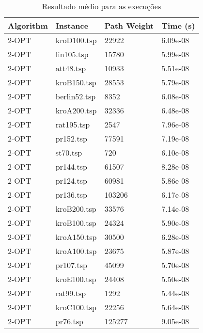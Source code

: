 \documentclass{article}
\begin{document}
\begin{center}

	\begin{table}[ht]
		\centering
		\begin{tabular}{llll}
			\toprule
			\textbf{Algorithm} & \textbf{Instance} & \textbf{Path Weight} & \textbf{Time (s)} \\
			\midrule
			2-OPT              & kroD100.tsp       & 22922                & 6.09e-08          \\
			2-OPT              & lin105.tsp        & 15780                & 5.99e-08          \\
			2-OPT              & att48.tsp         & 10933                & 5.51e-08          \\
			2-OPT              & kroB150.tsp       & 28553                & 5.79e-08          \\
			2-OPT              & berlin52.tsp      & 8352                 & 6.08e-08          \\
			2-OPT              & kroA200.tsp       & 32336                & 6.48e-08          \\
			2-OPT              & rat195.tsp        & 2547                 & 7.96e-08          \\
			2-OPT              & pr152.tsp         & 77591                & 7.19e-08          \\
			2-OPT              & st70.tsp          & 720                  & 6.10e-08          \\
			2-OPT              & pr144.tsp         & 61507                & 8.28e-08          \\
			2-OPT              & pr124.tsp         & 60981                & 5.86e-08          \\
			2-OPT              & pr136.tsp         & 103206               & 6.17e-08          \\
			2-OPT              & kroB200.tsp       & 33576                & 7.14e-08          \\
			2-OPT              & kroB100.tsp       & 24324                & 5.90e-08          \\
			2-OPT              & kroA150.tsp       & 30500                & 6.28e-08          \\
			2-OPT              & kroA100.tsp       & 23675                & 5.87e-08          \\
			2-OPT              & pr107.tsp         & 45099                & 5.70e-08          \\
			2-OPT              & kroE100.tsp       & 24408                & 5.50e-08          \\
			2-OPT              & rat99.tsp         & 1292                 & 5.44e-08          \\
			2-OPT              & kroC100.tsp       & 22256                & 5.64e-08          \\
			2-OPT              & pr76.tsp          & 125277               & 9.05e-08          \\
			\bottomrule
		\end{tabular}
		\caption{Resultado médio para as execuções}
	\end{table}

\end{center}
\end{document}
